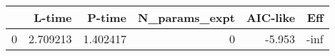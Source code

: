 \begin{tabular}{lrrrrr}
\toprule
{} &    L-time &    P-time &  N\_params\_expt &  AIC-like &  Eff \\
\midrule
0 &  2.709213 &  1.402417 &              0 &    -5.953 & -inf \\
\bottomrule
\end{tabular}
